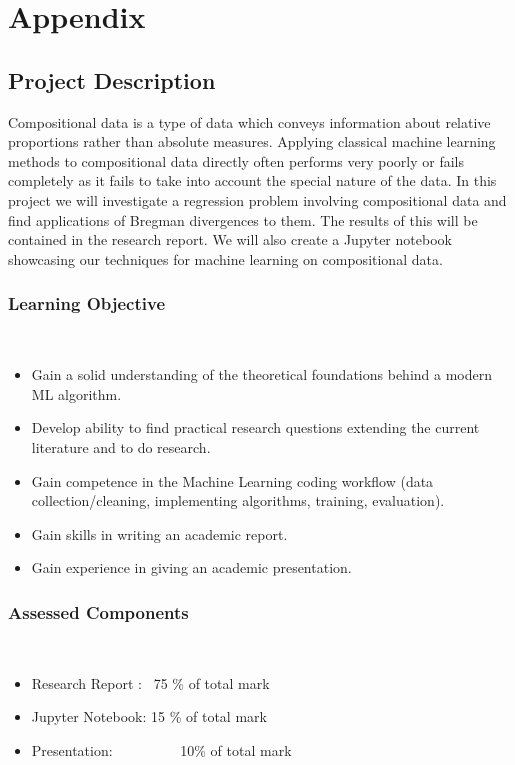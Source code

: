 \documentclass[BSc]{usydthesis}
\numberwithin{equation}{chapter}
\theoremstyle{remark}
\begin{document}
\chapter*{Appendix}
\section*{Project Description}
Compositional data is a type of data which conveys information about relative proportions rather than absolute measures. Applying classical machine learning methods to compositional data directly often performs very poorly or fails completely as it fails to take into account the special nature of the data. In this project we will investigate a regression problem involving compositional data and find applications of Bregman divergences to them. The results of this will be contained in the research report. We will also create a Jupyter notebook showcasing our techniques for machine learning on compositional data.\\

\subsection*{Learning Objective}
\ \\
\begin{itemize}
 \item Gain a solid understanding of the theoretical foundations behind a modern ML algorithm.\\
 \item Develop ability to find practical research questions extending the current literature and to do research.\\
 \item Gain competence in the Machine Learning coding workflow (data collection/cleaning, implementing algorithms, training, evaluation).\\
 \item Gain skills in writing an academic report.\\
 \item Gain experience in giving an academic presentation.\\
 
\end{itemize}



\subsection*{Assessed Components}
\ \\
\begin{itemize}
 \item Research Report : \ 75 \% of total mark \\
 \item Jupyter Notebook: 15 \% of total mark \\
 \item Presentation: \ \ \ \ \ \ \  \ \ 10\% of total mark \\
\end{itemize}
\end{document}
